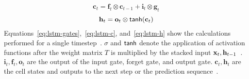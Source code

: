 \begin{equation}\label{eq:lstm-c}
    \textbf{c}_t=\textbf{f}_t\otimes\textbf{c}_{t-1} + \textbf{i}_t\otimes\textbf{g}_t
\end{equation}
\begin{equation}\label{eq:lstm-h}
    \textbf{h}_t=\textbf{o}_t\otimes\textsf{tanh}(\textbf{c}_t)
\end{equation}
Equations~\ref{eq:lstm-gates},~\ref{eq:lstm-c}, and~\ref{eq:lstm-h} show the calculations
performed for a single timestep~\citep{xu_show_2016}.
$\sigma$ and $\textsf{tanh}$ denote the application of activation functions after the weight matrix $T$
is multiplied by the stacked input $\textbf{x}_t,\textbf{h}_{t-1}$~\citep{zaremba_recurrent_2015}.
$\textbf{i}_t,\textbf{f}_t,\textbf{o}_t$ are the output of the input gate, forget gate, and output
gate.
$\textbf{c}_t,\textbf{h}_t$ are the cell states and outputs to the next step or the
prediction sequence~\citep{zaremba_recurrent_2015}.

